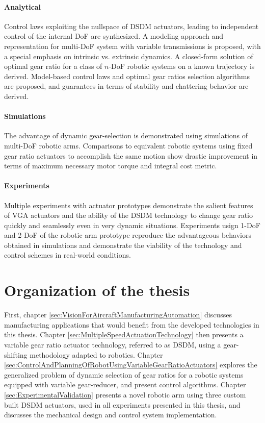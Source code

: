 \paragraph{Analytical}
%
Control laws exploiting the nullspace of DSDM actuators, leading to independent control of the internal DoF are synthesized. A modeling approach and representation for multi-DoF system with variable transmissions is proposed, with a special emphasis on intrinsic vs. extrinsic dynamics. A closed-form solution of optimal gear ratio for a class of $n$-DoF robotic systems on a known trajectory is derived. Model-based control laws and optimal gear ratios selection algorithms are proposed, and guarantees in terms of stability and chattering behavior are derived.

\paragraph{Simulations}
%
The advantage of dynamic gear-selection is demonstrated using simulations of multi-DoF robotic arms. Comparisons to equivalent robotic systems using fixed gear ratio actuators to accomplish the same motion show drastic improvement in terms of maximum necessary motor torque and integral cost metric. 

\paragraph{Experiments}
%
Multiple experiments with actuator prototypes demonstrate the salient features of VGA actuators and the ability of the DSDM technology to change gear ratio quickly and seamlessly even in very dynamic situations. Experiments usign 1-DoF and 2-DoF of the robotic arm prototype reproduce the advantageous behaviors obtained in simulations and demonstrate the viability of the technology and control schemes in real-world conditions.


\section{Organization of the thesis}
\label{sec:OrganisationOfTheThesis}

First, chapter \ref{sec:VisionForAircraftManufacturingAutomation} discusses manufacturing applications that would benefit from the developed technologies in this thesis. Chapter \ref{sec:MultipleSpeedActuationTechnology} then presents a variable gear ratio actuator technology, referred to as DSDM, using a gear-shifting methodology adapted to robotics. Chapter \ref{sec:ControlAndPlanningOfRobotUsingVariableGearRatioActuators} explores the generalized problem of dynamic selection of gear ratios for a robotic systems equipped with variable gear-reducer, and present control algorithms. Chapter \ref{sec:ExperimentalValidation} presents a novel robotic arm using three custom built DSDM actuators, used in all experiments presented in this thesis, and discusses the mechanical design and control system implementation. %


